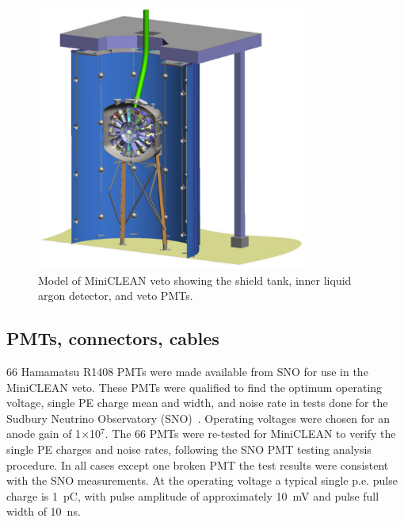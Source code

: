 \documentclass[review,number,sort&compress]{elsarticle}
\begin{document}
\begin{figure}[ht]
\begin{center}
\includegraphics[width=3.5in]{graphics/miniclean_overview_drawing.pdf}
\caption{Model of MiniCLEAN veto showing the shield tank, inner liquid argon detector, and veto PMTs.
\label{fig:veto_geom}}
\end{center}
\end{figure}

\subsection{PMTs, connectors, cables}
\label{sec:pmts}
%
66 Hamamatsu R1408 PMTs were made available from SNO for use in the
MiniCLEAN veto. These PMTs were qualified to find the optimum
operating voltage, single PE charge mean and width, and noise rate in
tests done for the Sudbury Neutrino Observatory
(SNO)~\cite{ref:sno_pmt_paper}.  Operating voltages were chosen for an
anode gain of 1$\times$10$^7$.  The 66 PMTs were re-tested for
MiniCLEAN to verify the single PE charges and noise rates, following
the SNO PMT testing analysis procedure.  In all cases except one
broken PMT the test results were consistent with the SNO measurements.
At the operating voltage a typical single p.e. pulse charge is 1~pC,
with pulse amplitude of approximately 10~mV and pulse full width of
10~ns.
\end{document}
